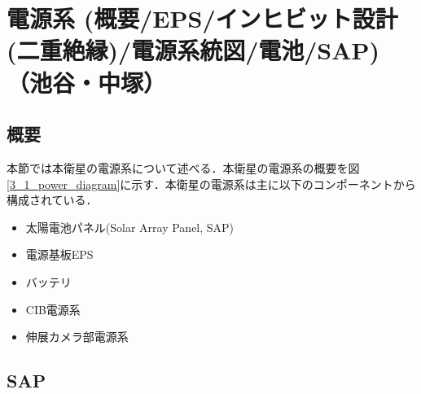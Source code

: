 \section{電源系 (概要/EPS/インヒビット設計(二重絶縁)/電源系統図/電池/SAP)（池谷・中塚）}
\subsection{概要}
本節では本衛星の電源系について述べる．本衛星の電源系の概要を図\ref{3_1_power_diagram}に示す．本衛星の電源系は主に以下のコンポーネントから構成されている．
\begin{itemize}
	\item 太陽電池パネル(Solar Array Panel, SAP)
	\item 電源基板EPS
	\item バッテリ
	\item CIB電源系
	\item 伸展カメラ部電源系
\end{itemize}




\subsection{SAP}
